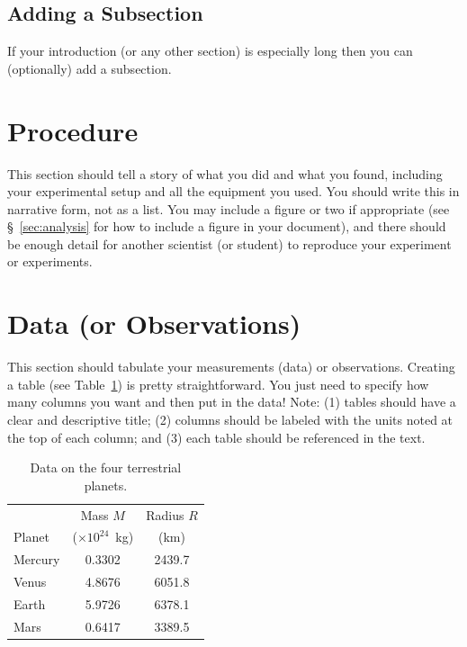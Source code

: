 \documentclass{revtex4}
\begin{document}
\subsection{Adding a Subsection}

If your introduction (or any other section) is especially long then you can (optionally) add a subsection.

\section{Procedure}

This section should tell a story of what you did and what you found, including your experimental setup and all the equipment you used.  You should write this in narrative form, not as a list.  You may include a figure or two if appropriate (see \S~\ref{sec:analysis} for how to include a figure in your document), and there should be enough detail for another scientist (or student) to reproduce your experiment or experiments.

\section{Data (or Observations)}

This section should tabulate your measurements (data) or observations. Creating a table (see Table~\ref{tab:data}) is pretty straightforward.  You just need to specify how many columns you want and then put in the data! Note: (1) tables should have a clear and descriptive title; (2) columns should be labeled with the units noted at the top of each column; and (3) each table should be referenced in the text.

\begin{table}[h]
\centering
\begin{tabular}{lcc}
\hline
  & Mass $M$ & Radius $R$ \\
Planet & ($\times10^{24}$~kg) & (km) \\
\hline
\hline
Mercury & 0.3302 & 2439.7 \\
Venus   & 4.8676 & 6051.8 \\
Earth   & 5.9726 & 6378.1 \\
Mars    & 0.6417 & 3389.5 \\
\hline
\end{tabular}
\caption{Data on the four terrestrial planets. \label{tab:data}} 
\end{table}
\end{document}
